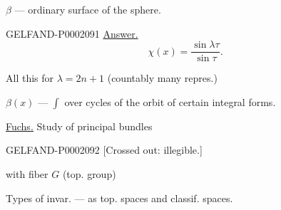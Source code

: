 $\beta$ --- ordinary surface of the sphere.



\begin{GelfandAdjacentEvidence}{GELFAND-P000209}{1}
\underline{Answer.}
\begin{equation*}\chi (x)=\frac{\sin\lambda\tau}{\sin\tau}.\end{equation*}
\end{GelfandAdjacentEvidence}

All this for $\lambda=2n+1$ (countably many repres.)



$\beta (x)$ --- $\int$ over cycles of the orbit of certain integral forms.






\underline{\underline{Fuchs.}} Study of principal bundles



\begin{GelfandAdjacentEvidence}{GELFAND-P000209}{2}
[Crossed out: illegible.]
\end{GelfandAdjacentEvidence}

with fiber $G$ (top. group)



Types of invar. --- as top. spaces and classif. spaces.



